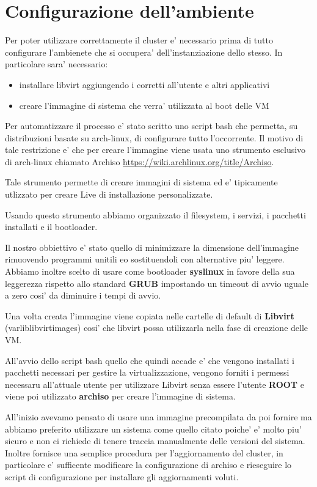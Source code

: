 \section{Configurazione dell'ambiente}
Per poter utilizzare correttamente il cluster e' necessario prima di tutto configurare
l'ambienete che si occupera' dell'instanziazione dello stesso. In particolare sara' necessario:
\begin{itemize}
    \item installare libvirt aggiungendo i corretti all'utente e altri applicativi
    \item creare l'immagine di sistema che verra' utilizzata al boot delle VM
\end{itemize}

Per automatizzare il processo e' stato scritto uno script bash che permetta, 
su distribuzioni basate su arch-linux, di configurare tutto l'occorrente.
Il motivo di tale restrizione e' che per creare l'immagine viene usata uno strumento
esclusivo di arch-linux chiamato Archiso \url{https://wiki.archlinux.org/title/Archiso}.

Tale strumento permette di creare immagini di sistema ed e' tipicamente utlizzato per creare 
Live di installazione personalizzate. 

Usando questo strumento abbiamo organizzato il filesystem, i servizi, i pacchetti installati e il 
bootloader.

Il nostro obbiettivo e' stato quello di minimizzare la dimensione dell'immagine rimuovendo programmi
unitili e\/o sostituendoli con alternative piu' leggere.
Abbiamo inoltre scelto di usare come bootloader \textbf{syslinux} in favore della sua leggerezza 
rispetto allo standard \textbf{GRUB} impostando un timeout di avvio uguale a zero cosi' da diminuire
i tempi di avvio.

Una volta creata l'immagine viene copiata nelle cartelle di default di \textbf{Libvirt} 
(\/var\/lib\/libvirt\/images\/) cosi' che libvirt possa utilizzarla nella fase di creazione
delle VM.

All'avvio dello script bash quello che quindi accade e' che vengono installati i pacchetti
necessari per gestire la virtualizzazione, vengono forniti i permessi necessaru all'attuale utente
per utilizzare Libvirt senza essere l'utente \textbf{ROOT} e viene poi utilizzato 
\textbf{archiso} per creare l'immagine di sistema.

All'inizio avevamo pensato di usare una immagine precompilata da poi fornire ma abbiamo preferito
utilizzare un sistema come quello citato poiche' e' molto piu' sicuro e non ci richiede di tenere
traccia manualmente delle versioni del sistema. Inoltre fornisce una semplice procedura
per l'aggiornamento del cluster, in particolare e' sufficente modificare la configurazione di 
archiso e rieseguire lo script di configurazione per installare gli aggiornamenti voluti. 
